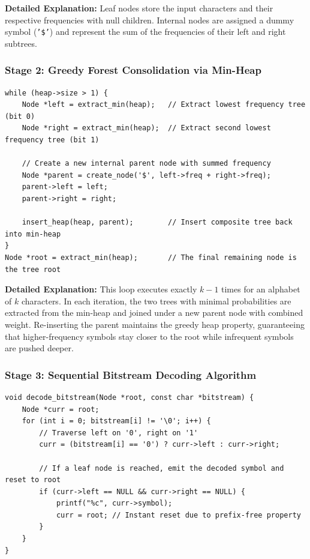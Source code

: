 \documentclass[11pt,a4paper]{article}
\begin{document}
\noindent \textbf{Detailed Explanation:}
Leaf nodes store the input characters and their respective frequencies with null children. Internal nodes are assigned a dummy symbol (\texttt{'\$'}) and represent the sum of the frequencies of their left and right subtrees.

\subsubsection{Stage 2: Greedy Forest Consolidation via Min-Heap}
\begin{lstlisting}[style=cstyle, caption={Greedy merging of the two lowest-frequency trees}]
while (heap->size > 1) {
    Node *left = extract_min(heap);   // Extract lowest frequency tree (bit 0)
    Node *right = extract_min(heap);  // Extract second lowest frequency tree (bit 1)

    // Create a new internal parent node with summed frequency
    Node *parent = create_node('$', left->freq + right->freq);
    parent->left = left;
    parent->right = right;

    insert_heap(heap, parent);        // Insert composite tree back into min-heap
}
Node *root = extract_min(heap);       // The final remaining node is the tree root
\end{lstlisting}

\noindent \textbf{Detailed Explanation:}
This loop executes exactly $k - 1$ times for an alphabet of $k$ characters. In each iteration, the two trees with minimal probabilities are extracted from the min-heap and joined under a new parent node with combined weight. Re-inserting the parent maintains the greedy heap property, guaranteeing that higher-frequency symbols stay closer to the root while infrequent symbols are pushed deeper.

\subsubsection{Stage 3: Sequential Bitstream Decoding Algorithm}
\begin{lstlisting}[style=cstyle, caption={Prefix-free bitstream decoding traversal}]
void decode_bitstream(Node *root, const char *bitstream) {
    Node *curr = root;
    for (int i = 0; bitstream[i] != '\0'; i++) {
        // Traverse left on '0', right on '1'
        curr = (bitstream[i] == '0') ? curr->left : curr->right;

        // If a leaf node is reached, emit the decoded symbol and reset to root
        if (curr->left == NULL && curr->right == NULL) {
            printf("%c", curr->symbol);
            curr = root; // Instant reset due to prefix-free property
        }
    }
}
\end{lstlisting}
\end{document}
